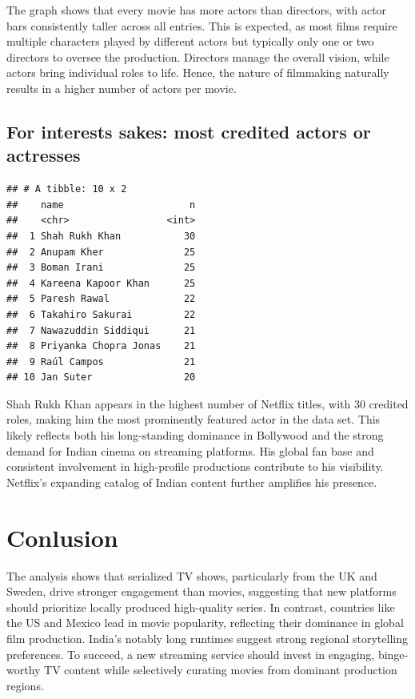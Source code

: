 \documentclass[11pt,preprint]{elsarticle}
\numberwithin{equation}{section}
\numberwithin{figure}{section}
\numberwithin{table}{section}
\begin{document}
The graph shows that every movie has more actors than directors, with
actor bars consistently taller across all entries. This is expected, as
most films require multiple characters played by different actors but
typically only one or two directors to oversee the production. Directors
manage the overall vision, while actors bring individual roles to life.
Hence, the nature of filmmaking naturally results in a higher number of
actors per movie.

\subsection{For interests sakes: most credited actors or
actresses}\label{for-interests-sakes-most-credited-actors-or-actresses}

\begin{Shaded}
\begin{Highlighting}[]
\SpecialCharTok{\%\textgreater{}\%}
   \NormalTok{) }\SpecialCharTok{\%\textgreater{}\%}
  \NormalTok{(} \NormalTok{)}
\end{Highlighting}
\end{Shaded}

\begin{verbatim}
## # A tibble: 10 x 2
##    name                      n
##    <chr>                 <int>
##  1 Shah Rukh Khan           30
##  2 Anupam Kher              25
##  3 Boman Irani              25
##  4 Kareena Kapoor Khan      25
##  5 Paresh Rawal             22
##  6 Takahiro Sakurai         22
##  7 Nawazuddin Siddiqui      21
##  8 Priyanka Chopra Jonas    21
##  9 Raúl Campos              21
## 10 Jan Suter                20
\end{verbatim}

Shah Rukh Khan appears in the highest number of Netflix titles, with 30
credited roles, making him the most prominently featured actor in the
data set. This likely reflects both his long-standing dominance in
Bollywood and the strong demand for Indian cinema on streaming
platforms. His global fan base and consistent involvement in
high-profile productions contribute to his visibility. Netflix's
expanding catalog of Indian content further amplifies his presence.

\section{Conlusion}\label{conlusion}

The analysis shows that serialized TV shows, particularly from the UK
and Sweden, drive stronger engagement than movies, suggesting that new
platforms should prioritize locally produced high-quality series. In
contrast, countries like the US and Mexico lead in movie popularity,
reflecting their dominance in global film production. India's notably
long runtimes suggest strong regional storytelling preferences. To
succeed, a new streaming service should invest in engaging, binge-worthy
TV content while selectively curating movies from dominant production
regions.


\end{document}
